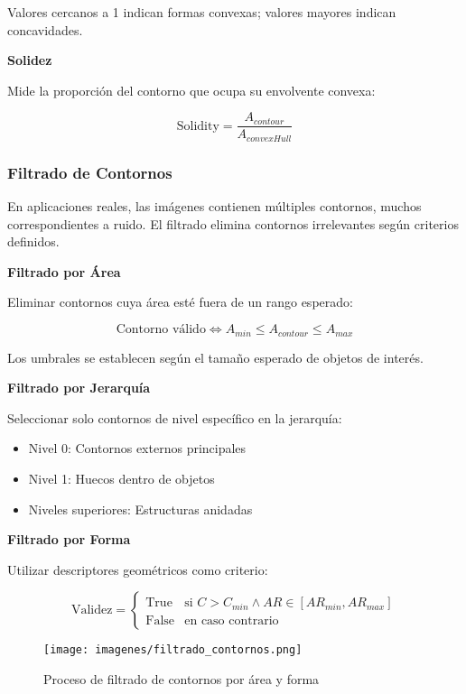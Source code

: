 Valores cercanos a 1 indican formas convexas; valores mayores indican concavidades.

\textbf{Solidez}

Mide la proporción del contorno que ocupa su envolvente convexa:

\begin{equation}
\text{Solidity} = \frac{A_{contour}}{A_{convexHull}}
\end{equation}

\subsubsection{Filtrado de Contornos}

En aplicaciones reales, las imágenes contienen múltiples contornos, muchos correspondientes a ruido. El filtrado elimina contornos irrelevantes según criterios definidos.

\textbf{Filtrado por Área}

Eliminar contornos cuya área esté fuera de un rango esperado:

\begin{equation}
\text{Contorno válido} \Leftrightarrow A_{min} \leq A_{contour} \leq A_{max}
\end{equation}

Los umbrales se establecen según el tamaño esperado de objetos de interés.

\textbf{Filtrado por Jerarquía}

Seleccionar solo contornos de nivel específico en la jerarquía:
\begin{itemize}
\item Nivel 0: Contornos externos principales
\item Nivel 1: Huecos dentro de objetos
\item Niveles superiores: Estructuras anidadas
\end{itemize}

\textbf{Filtrado por Forma}

Utilizar descriptores geométricos como criterio:

\begin{equation}
\text{Validez} = \begin{cases}
\text{True} & \text{si } C > C_{min} \land AR \in [AR_{min}, AR_{max}] \\
\text{False} & \text{en caso contrario}
\end{cases}
\end{equation}

\begin{figure}[h]
\centering
\texttt{[image: imagenes/filtrado\_contornos.png]}
\caption{Proceso de filtrado de contornos por área y forma}
\label{fig:filtrado_contornos}
\end{figure}

